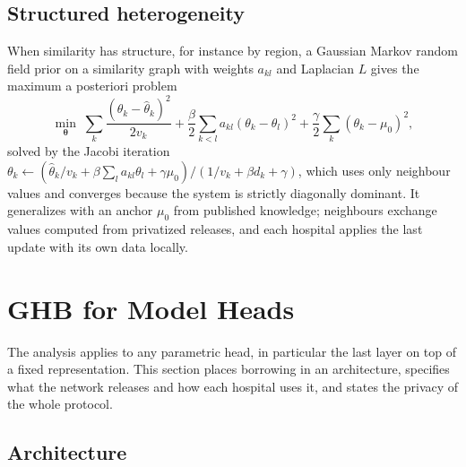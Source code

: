\documentclass[acmsmall,screen,review]{acmart}
\theoremstyle{acmdefinition}
\begin{document}
\subsection{Structured heterogeneity}\label{sec:structured}

When similarity has structure, for instance by region, a Gaussian Markov random field prior \cite{rue2005gaussian} on a similarity graph with weights $a_{kl}$ and Laplacian $L$ gives the maximum a posteriori problem
\begin{equation}\label{eq:gmrf}
\min_{\boldsymbol{\theta}}\;\sum_k\frac{(\theta_k-\hat{\theta}_k)^2}{2v_k}+\frac{\beta}{2}\sum_{k<l}a_{kl}(\theta_k-\theta_l)^2+\frac{\gamma}{2}\sum_k(\theta_k-\mu_0)^2,
\end{equation}
solved by the Jacobi iteration $\theta_k\leftarrow(\hat{\theta}_k/v_k+\beta\sum_l a_{kl}\theta_l+\gamma\mu_0)/(1/v_k+\beta d_k+\gamma)$, which uses only neighbour values and converges because the system is strictly diagonally dominant. It generalizes \citet{vanhaesebrouck2017decentralized} with an anchor $\mu_0$ from published knowledge; neighbours exchange values computed from privatized releases, and each hospital applies the last update with its own data locally.

\section{GHB for Model Heads}\label{sec:heads}

The analysis applies to any parametric head, in particular the last layer on top of a fixed representation. This section places borrowing in an architecture, specifies what the network releases and how each hospital uses it, and states the privacy of the whole protocol.

\subsection{Architecture}\label{sec:architecture}
\end{document}

